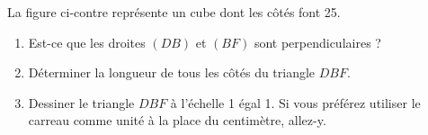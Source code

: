 
\begin{exercice}\label{exoSeconde-0094}

    \begin{multicols}{2}
        La figure ci-contre représente un cube dont les côtés font \unit{25}{\meter}. 
        \begin{enumerate}
            \item
        Est-ce que les droites \( (DB)\) et \( (BF)\) sont perpendiculaires ?
    \item
        Déterminer la longueur de tous les côtés du triangle \( DBF\).
    \item
        Dessiner le triangle \( DBF\) à l'échelle \unit{1}{\centi\meter} égal \unit{1}{\meter}. Si vous préférez utiliser le carreau comme unité à la place du centimètre, allez-y.
                
        \end{enumerate}

        \columnbreak

        \begin{center}

        \end{center}


    \end{multicols}



\end{exercice}
